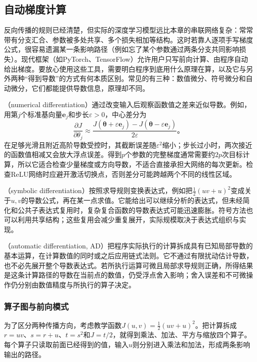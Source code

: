 \subsection{自动梯度计算}
\label{sec:ffn-autodiff}

反向传播的规则已经清楚，但实际的深度学习模型远比本章的串联网络复杂：常常带有分支汇合、参数被多处共享、多个损失相加等结构。这时若靠人逐项手写梯度公式，很容易遗漏某一条影响路径（例如忘了某个参数通过两条分支共同影响损失）。现代框架（如PyTorch、TensorFlow）允许用户只写前向计算、由程序自动给出梯度。要放心使用这些工具，需要明白程序到底用什么原理在算，以及它与另外两种“得到导数”的方式有何本质区别。常见的有三种：数值微分、符号微分和自动微分，它们都能提供导数信息，原理却不同。

（numerical differentiation）通过改变输入后观察函数值之差来近似导数。例如，用第$j$个标准基向量$\bm{e}_j$和步长$\varepsilon>0$，中心差分为
\begin{equation}
  \frac{\partial J}{\partial\theta_j}
  \approx
  \frac{J(\bm{\theta}+\varepsilon\bm{e}_j)
       -J(\bm{\theta}-\varepsilon\bm{e}_j)}{2\varepsilon}\text{。}
  \label{eq:ffn-finite-difference}
\end{equation}
在足够光滑且附近高阶导数受控时，其截断误差随$\varepsilon^2$缩小；步长过小时，两次接近的函数值相减又会放大浮点误差。得到$p$个参数的完整梯度通常需要约$2p$次目标计算，所以它适合检查少量梯度或方向导数，不适合直接承担大网络的每次更新。检查ReLU网络时应避开激活切换点，否则差分可能跨越两个不同的线性区域。

（symbolic differentiation）按照求导规则变换表达式，例如把$\frac12(uv+u)^2$变成关于$u,v$的导数公式，再在某一点求值。它能给出可以继续分析的表达式，但未经简化和公共子表达式复用时，复杂复合函数的导数表达式可能迅速膨胀。符号方法也可以利用共享结构；这些复用会减少重复展开，实际规模取决于表达式组织与实现。

（automatic differentiation, AD）把程序实际执行的计算拆成具有已知局部导数的基本运算，在计算数值的同时或之后应用链式法则。它不通过有限扰动估计导数，也不必先展开整个导数表达式。若所执行运算可微且局部求导规则正确，所得结果是这条计算路径的导数在当前点的数值，仍受浮点舍入影响；舍入误差和不可微操作仍分别由数值精度与所执行的算子决定。

\subsubsection{算子图与前向模式}
\label{sec:ffn-autodiff-forward}

为了区分两种传播方向，考虑教学函数$J(u,v)=\frac12(uv+u)^2$。把计算拆成$r=uv$、$s=r+u$、$t=s^2$和$J=t/2$，就得到乘法、加法、平方与缩放四个算子。每个算子只读取前面已经得到的值，输入$u$则分别进入乘法和加法，形成两条影响输出的路径。

